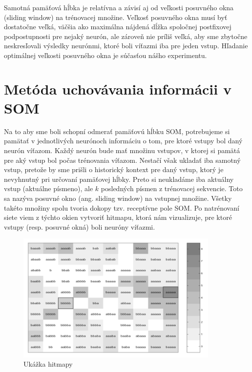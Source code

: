 Samotná pamäťová hĺbka je relatívna a závisí aj od veľkosti posuvného okna (sliding window) na trénovacej množine.
Veľkosť posuvného okna musí byť dostatočne veľká, väčšia ako maximálna nájdená
dĺžka spoločnej postfixovej podpostupnosti pre nejaký neurón, ale zároveň nie príliš veľká, aby sme zbytočne neskresľovali výsledky neurónmi, ktoré boli víťazmi iba pre jeden vstup.
Hľadanie optimálnej veľkosti posuvného okna je súčasťou nášho experimentu.

\section{Metóda uchovávania informácii v SOM}
Na to aby sme boli schopní odmerať pamäťovú hĺbku SOM, potrebujeme si pamätať v jednotlivých
neurónoch informáciu o tom, pre ktoré vstupy bol daný neurón víťazom.
Každý neurón bude mať množinu vstupov, v ktorej si pamätá pre aký vstup bol počas trénovania víťazom. 
Nestačí však ukladať iba samotný vstup, pretože by sme prišli o historický kontext pre daný vstup, 
ktorý je nevyhnutný pri určovaní pamäťovej hĺbky. 
Preto si neukladáme iba aktuálny vstup (aktuálne písmeno), 
ale $k$ posledných písmen z trénovacej sekvencie.
Toto sa nazýva posuvné okno (ang. sliding window) na vstupnej množine. 
Všetky takéto množiny spolu tvoria dokopy tzv. receptívne pole SOM.
Po natrénovaní siete viem z týchto okien vytvoriť hitmapu, 
ktorá nám vizualizuje, pre ktoré vstupy (resp. posuvné okná) boli neuróny víťazmi.

\begin{figure}[H]
	\centering
	\includegraphics[width=10cm]{assets/receptive_field}
	\caption{Ukážka hitmapy}
\end{figure}

